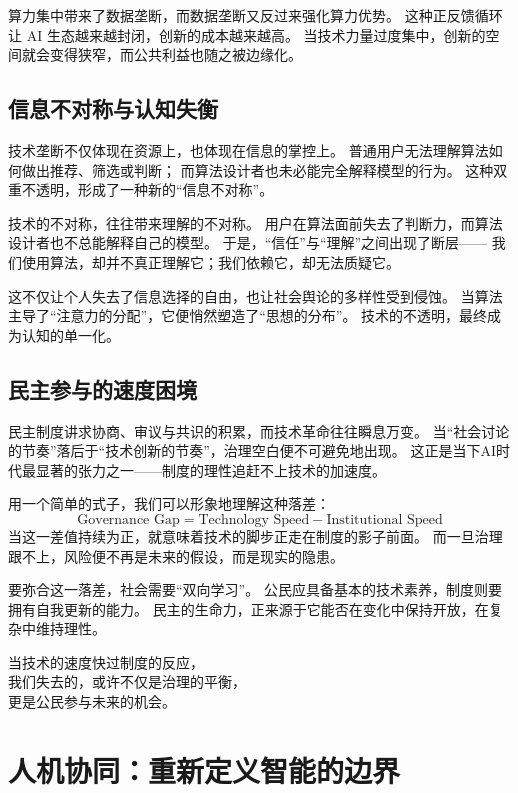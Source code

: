 算力集中带来了数据垄断，而数据垄断又反过来强化算力优势。  
这种正反馈循环让 AI 生态越来越封闭，创新的成本越来越高。  
当技术力量过度集中，创新的空间就会变得狭窄，而公共利益也随之被边缘化。

\subsection{信息不对称与认知失衡}

技术垄断不仅体现在资源上，也体现在信息的掌控上。  
普通用户无法理解算法如何做出推荐、筛选或判断；  
而算法设计者也未必能完全解释模型的行为。  
这种双重不透明，形成了一种新的“信息不对称”。  

技术的不对称，往往带来理解的不对称。  
用户在算法面前失去了判断力，而算法设计者也不总能解释自己的模型。  
于是，“信任”与“理解”之间出现了断层——  
我们使用算法，却并不真正理解它；我们依赖它，却无法质疑它。

这不仅让个人失去了信息选择的自由，也让社会舆论的多样性受到侵蚀。  
当算法主导了“注意力的分配”，它便悄然塑造了“思想的分布”。  
技术的不透明，最终成为认知的单一化。

\subsection{民主参与的速度困境}

民主制度讲求协商、审议与共识的积累，而技术革命往往瞬息万变。  
当“社会讨论的节奏”落后于“技术创新的节奏”，治理空白便不可避免地出现。  
这正是当下AI时代最显著的张力之一——制度的理性追赶不上技术的加速度。

用一个简单的式子，我们可以形象地理解这种落差：
\begin{equation}
\text{Governance Gap} = \text{Technology Speed} - \text{Institutional Speed}
\end{equation}
当这一差值持续为正，就意味着技术的脚步正走在制度的影子前面。  
而一旦治理跟不上，风险便不再是未来的假设，而是现实的隐患。

要弥合这一落差，社会需要“双向学习”。  
公民应具备基本的技术素养，制度则要拥有自我更新的能力。  
民主的生命力，正来源于它能否在变化中保持开放，在复杂中维持理性。

\begin{center}
当技术的速度快过制度的反应，  \\
我们失去的，或许不仅是治理的平衡，\\  
更是公民参与未来的机会。  
\end{center}

\section{人机协同：重新定义智能的边界}

